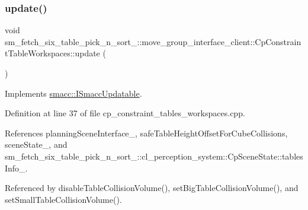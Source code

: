 \subsubsection{\texorpdfstring{update()}{update()}}
{\footnotesize\ttfamily void sm\+\_\+fetch\+\_\+six\+\_\+table\+\_\+pick\+\_\+n\+\_\+sort\+\_\+::move\+\_\+group\+\_\+interface\+\_\+client\+::\+Cp\+Constraint\+Table\+Workspaces\+::update (\begin{DoxyParamCaption}{ }\end{DoxyParamCaption})\hspace{0.3cm}{\ttfamily [virtual]}}



Implements \hyperlink{classsmacc_1_1ISmaccUpdatable_a84ee0520cbefdb1d412bed54650b028e}{smacc\+::\+I\+Smacc\+Updatable}.



Definition at line 37 of file cp\+\_\+constraint\+\_\+tables\+\_\+workspaces.\+cpp.



References planning\+Scene\+Interface\+\_\+, safe\+Table\+Height\+Offset\+For\+Cube\+Collisions, scene\+State\+\_\+, and sm\+\_\+fetch\+\_\+six\+\_\+table\+\_\+pick\+\_\+n\+\_\+sort\+\_\+::cl\+\_\+perception\+\_\+system\+::\+Cp\+Scene\+State\+::tables\+Info\+\_\+.



Referenced by disable\+Table\+Collision\+Volume(), set\+Big\+Table\+Collision\+Volume(), and set\+Small\+Table\+Collision\+Volume().


